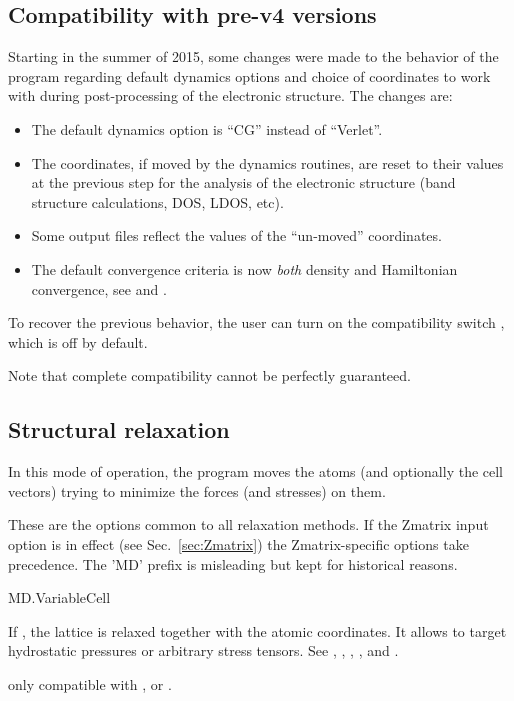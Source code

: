 \subsection{Compatibility with pre-v4 versions}

Starting in the summer of 2015, some changes were made to the behavior
of the program regarding default dynamics options and choice of
coordinates to work with during post-processing of the electronic
structure. The changes are:

\begin{itemize}
  \item %
  The default dynamics option is ``CG'' instead of ``Verlet''.

  \item%
  The coordinates, if moved by the dynamics routines, are reset to
  their values at the previous step for the analysis of the electronic 
  structure (band structure calculations, DOS, LDOS, etc).

  \item%
  Some output files reflect the values of the ``un-moved''
  coordinates.

  \item%
  The default convergence criteria is now \emph{both} density and
  Hamiltonian convergence, see  and
  .

\end{itemize}

To recover the previous behavior, the user can turn on the
compatibility switch , which is off by
default.

Note that complete compatibility cannot be perfectly guaranteed.

\subsection{Structural relaxation}

In this mode of operation, the program moves the atoms (and optionally
the cell vectors) trying to minimize the forces (and stresses) on
them.

These are the options common to all relaxation methods. If the Zmatrix
input option is in effect (see Sec.~\ref{sec:Zmatrix}) the
Zmatrix-specific options take precedence.  The 'MD' prefix is
misleading but kept for historical reasons.

\begin{fdflogicalF}{MD.VariableCell}

  If \fdftrue, the lattice is relaxed together with the atomic
  coordinates. It allows to target hydrostatic pressures or arbitrary
  stress tensors. See ,
  , ,
  , and
  .

  \note only compatible with  ,
   or .

\end{fdflogicalF}


